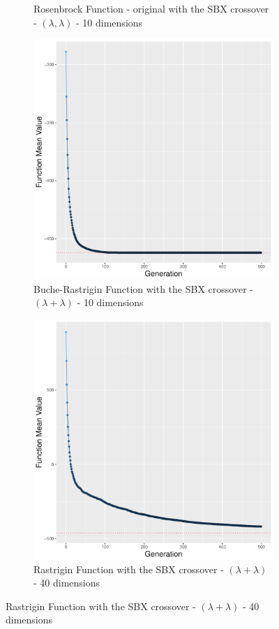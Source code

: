 \begin{figure}[!t]
\begin{subfigure}[b]{0.24\textwidth}
		\caption{Rosenbrock Function - original with the SBX crossover - $(\lambda, \lambda)$ - 10 dimensions}
	\end{subfigure}
	\begin{subfigure}[b]{0.24\textwidth}
		\centering
		\includegraphics[width=\textwidth]{img/covergency_multimodal_sbx_4_dim_10_tsize_5.pdf}
		\caption{Buche-Rastrigin Function with the SBX crossover - $(\lambda + \lambda)$ - 10 dimensions}
	\end{subfigure}
	\begin{subfigure}[b]{0.24\textwidth}	
		\includegraphics[width=\textwidth]{img/covergency_multimodal_sbx_3_dim_40_tsize_4.pdf}		
		\caption{Rastrigin Function with the SBX crossover - $(\lambda + \lambda)$ - 40 dimensions}
	\end{subfigure}
	\label{convergence}


\end{figure}
